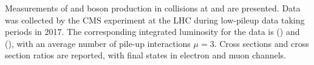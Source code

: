 % 
% 
%

Measurements of \W and \Z boson production in \pp collisions at \sg and \sh are presented. Data was collected by the CMS experiment at the LHC during low-pileup data taking periods in 2017. The corresponding integrated luminosity for the data is \lumig (\sg) and \lumih (\sh), with an average number of pile-up interactions $\mu=3$. Cross sections and cross section ratios are reported, with final states in electron and muon channels. 

